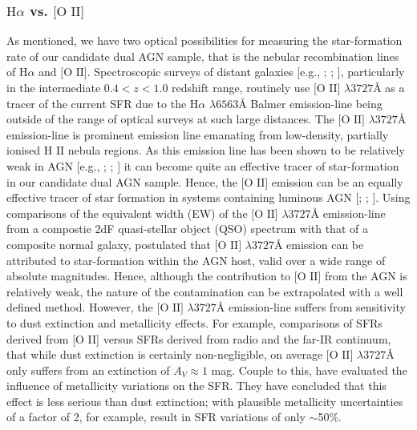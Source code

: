 \subsubsection{$\text{H}\alpha$ vs. $\text{[O II]}$}

As mentioned, we have two optical possibilities for measuring the star-formation rate of our candidate dual AGN sample, that is the nebular recombination lines of $\text{H}\alpha$ and $\text{[O II]}$. Spectroscopic surveys of distant galaxies [e.g., \cite{Lilly_1996}; \cite{Hippelein_2003}; \cite{Cardiel_2003}], particularly in the intermediate ${0.4}<{z}<{1.0}$ redshift range, routinely use $\text{[O II]}$ $\lambda{3727}Å$ as a tracer of the current SFR due to the $\text{H}\alpha$ $\lambda 6563Å$ Balmer emission-line being outside of the range of optical surveys at such large distances. The $\text{[O II]}$ $\lambda{3727}Å$ emission-line is prominent emission line emanating from low-density, partially ionised $\text{H II}$ nebula regions. As this emission line has been shown to be relatively weak in AGN [e.g., \cite{Ferland_1986}; \cite{Ho_1993}; \cite{Kim_2006}] it can become quite an effective tracer of star-formation in our candidate dual AGN sample. Hence, the $\text{[O II]}$ emission can be an equally effective tracer of star formation in systems containing luminous AGN [\cite{2006ApJ...642..702K}; \cite{2009ApJ...696..396S}; \cite{2012MNRAS.427.2401K}]. Using comparisons of the equivalent width (EW) of the $\text{[O II]}$  $\lambda{3727}Å$ emission-line from a compostie 2dF quasi-stellar object (QSO) spectrum with that of a composite normal galaxy, \cite{2002MNRAS.337..275C} postulated that $\text{[O II]}$ $\lambda{3727}Å$ emission can be attributed to star-formation within the AGN host, valid over a wide range of absolute magnitudes. Hence, although the contribution to $\text{[O II]}$ from the AGN is relatively weak, the nature of the contamination can be extrapolated with a well defined method. However, the $\text{[O II]}$ $\lambda{3727}Å$ emission-line suffers from sensitivity to dust extinction and metallicity effects. For example, comparisons of SFRs derived from [O II] versus SFRs derived from radio and the far-IR continuum, that while dust extinction is certainly non-negligible, on average $\text{[O II]}$ $\lambda{3727}Å$ only suffers from an extinction of $A_V\approx{1}$ mag. Couple to this, \cite{Kewley_2004} have evaluated the influence of metallicity variations on the SFR. They have concluded that this effect is less serious than dust extinction; with plausible metallicity uncertainties of a factor of 2, for example, result in SFR variations of only $\sim$50\%.

